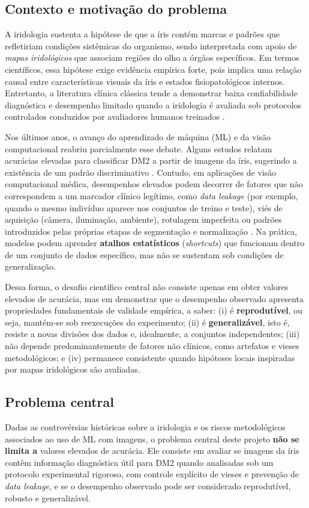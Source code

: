\documentclass[12pt,a4paper]{article}
\begin{document}
\subsection{Contexto e motivação do problema}
A iridologia sustenta a hipótese de que a íris contém marcas e padrões que refletiriam condições sistêmicas do organismo, sendo interpretada com apoio de \textit{mapas iridológicos} que associam regiões do olho a órgãos específicos. Em termos científicos, essa hipótese exige evidência empírica forte, pois implica uma relação causal entre características visuais da íris e estados fisiopatológicos internos. Entretanto, a literatura clínica clássica tende a demonstrar baixa confiabilidade diagnóstica e desempenho limitado quando a iridologia é avaliada sob protocolos controlados conduzidos por avaliadores humanos treinados \citep{Simon1979JAMA, Knipschild1988BMJ, Ernst2000ArchOphthalmol}.

Nos últimos anos, o avanço do aprendizado de máquina (ML) e da visão computacional reabriu parcialmente esse debate. Alguns estudos relatam acurácias elevadas para classificar DM2 a partir de imagens da íris, sugerindo a existência de um padrão discriminativo \citep{SamantAgarwal2018CMPB}. Contudo, em aplicações de visão computacional médica, desempenhos elevados podem decorrer de fatores que não correspondem a um marcador clínico legítimo, como \textit{data leakage} (por exemplo, quando o mesmo indivíduo aparece nos conjuntos de treino e teste), viés de aquisição (câmera, iluminação, ambiente), rotulagem imperfeita ou padrões introduzidos pelas próprias etapas de segmentação e normalização \citep{Zech2018}. Na prática, modelos podem aprender \textbf{atalhos estatísticos} (\textit{shortcuts}) que funcionam dentro de um conjunto de dados específico, mas não se sustentam sob condições de generalização.

Dessa forma, o desafio científico central não consiste apenas em obter valores elevados de acurácia, mas em demonstrar que o desempenho observado apresenta propriedades fundamentais de validade empírica, a saber:
(i) é \textbf{reprodutível}, ou seja, mantém-se sob reexecuções do experimento;
(ii) é \textbf{generalizável}, isto é, resiste a novas divisões dos dados e, idealmente, a conjuntos independentes;
(iii) não depende predominantemente de fatores não clínicos, como artefatos e vieses metodológicos;
e (iv) permanece consistente quando hipóteses locais inspiradas por mapas iridológicos são avaliadas.

\subsection{Problema central}
Dadas as controvérsias históricas sobre a iridologia e os riscos metodológicos associados ao uso de ML com imagens, o problema central deste projeto \textbf{não se limita a} valores elevados de acurácia. Ele consiste em avaliar se imagens da íris contêm informação diagnóstica útil para DM2 quando analisadas sob um protocolo experimental rigoroso, com controle explícito de vieses e prevenção de \textit{data leakage}, e se o desempenho observado pode ser considerado reprodutível, robusto e generalizável.
\end{document}
